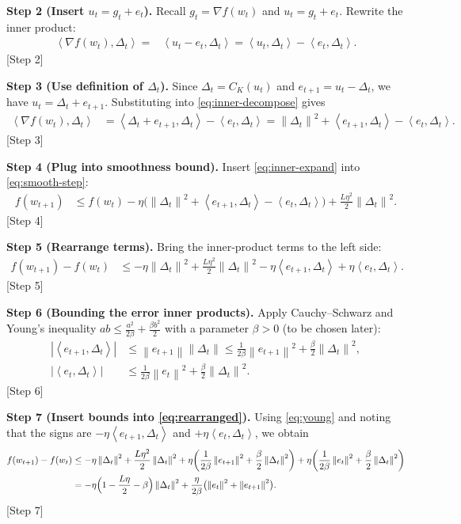 \documentclass{article}
\newcommand{\norm}[1]{\left\|#1\right\|}
\newcommand{\ip}[2]{\left\langle #1,#2\right\rangle}
\begin{document}
\bigskip
\noindent\textbf{Step 2 (Insert $u_t=g_t+e_t$).}  
Recall $g_t=\nabla f(w_t)$ and $u_t=g_t+e_t$. Rewrite the inner product:
\begin{align}
\ip{\nabla f(w_t)}{\Delta_t}
=&\ip{u_t-e_t}{\Delta_t}
 =\ip{u_t}{\Delta_t}-\ip{e_t}{\Delta_t}. \label{eq:inner-decompose}
\end{align}
[Step 2]

\bigskip
\noindent\textbf{Step 3 (Use definition of $\Delta_t$).}  
Since $\Delta_t=C_{K}(u_t)$ and $e_{t+1}=u_t-\Delta_t$, we have $u_t=\Delta_t+e_{t+1}$. Substituting into \eqref{eq:inner-decompose} gives
\begin{align}
\ip{\nabla f(w_t)}{\Delta_t}
&=\ip{\Delta_t+e_{t+1}}{\Delta_t}-\ip{e_t}{\Delta_t}
 =\norm{\Delta_t}^{2}+\ip{e_{t+1}}{\Delta_t}-\ip{e_t}{\Delta_t}. \label{eq:inner-expand}
\end{align}
[Step 3]

\bigskip
\noindent\textbf{Step 4 (Plug into smoothness bound).}  
Insert \eqref{eq:inner-expand} into \eqref{eq:smooth-step}:
\begin{align}
f(w_{t+1})
&\le f(w_t)-\eta\bigl(\norm{\Delta_t}^{2}+\ip{e_{t+1}}{\Delta_t}-\ip{e_t}{\Delta_t}\bigr)
    +\frac{L\eta^{2}}{2}\norm{\Delta_t}^{2} . \label{eq:pre-final}
\end{align}
[Step 4]

\bigskip
\noindent\textbf{Step 5 (Rearrange terms).}  
Bring the inner‑product terms to the left side:
\begin{align}
f(w_{t+1})-f(w_t)
&\le -\eta\norm{\Delta_t}^{2}
   +\frac{L\eta^{2}}{2}\norm{\Delta_t}^{2}
   -\eta\ip{e_{t+1}}{\Delta_t}
   +\eta\ip{e_t}{\Delta_t}. \label{eq:rearranged}
\end{align}
[Step 5]

\bigskip
\noindent\textbf{Step 6 (Bounding the error inner products).}  
Apply Cauchy–Schwarz and Young’s inequality $ab\le\frac{a^{2}}{2\beta}+\frac{\beta b^{2}}{2}$ with a parameter $\beta>0$ (to be chosen later):
\begin{align}
|\ip{e_{t+1}}{\Delta_t}|
&\le \norm{e_{t+1}}\norm{\Delta_t}
 \le \frac{1}{2\beta}\norm{e_{t+1}}^{2}
      +\frac{\beta}{2}\norm{\Delta_t}^{2}, \\
|\ip{e_{t}}{\Delta_t}|
&\le \frac{1}{2\beta}\norm{e_{t}}^{2}
      +\frac{\beta}{2}\norm{\Delta_t}^{2}. \label{eq:young}
\end{align}
[Step 6]

\bigskip
\noindent\textbf{Step 7 (Insert bounds into \eqref{eq:rearranged}).}  
Using \eqref{eq:young} and noting that the signs are $-\eta\ip{e_{t+1}}{\Delta_t}$ and $+\eta\ip{e_t}{\Delta_t}$, we obtain
\begin{align}
f(w_{t+1})-f(w_t)
&\le -\eta\norm{\Delta_t}^{2}
   +\frac{L\eta^{2}}{2}\norm{\Delta_t}^{2}
   +\eta\!\left(\frac{1}{2\beta}\norm{e_{t+1}}^{2}
                +\frac{\beta}{2}\norm{\Delta_t}^{2}\right)
   +\eta\!\left(\frac{1}{2\beta}\norm{e_{t}}^{2}
                +\frac{\beta}{2}\norm{\Delta_t}^{2}\right) \nonumber\\
&= -\eta\Bigl(1-\frac{L\eta}{2}-\beta\Bigr)\norm{\Delta_t}^{2}
   +\frac{\eta}{2\beta}\bigl(\norm{e_{t}}^{2}+\norm{e_{t+1}}^{2}\bigr). \label{eq:after-young}
\end{align}
[Step 7]
\end{document}
